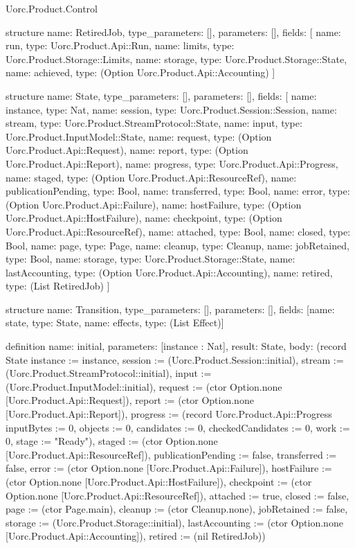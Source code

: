 \begin{lexlean}{Uorc.Product.Control}
\begin{semanticmodule}
structure{
  name: RetiredJob,
  type_parameters: [],
  parameters: [],
  fields: [
    {name: run, type: Uorc.Product.Api::Run},
    {name: limits, type: Uorc.Product.Storage::Limits},
    {name: storage, type: Uorc.Product.Storage::State},
    {name: achieved, type: (Option Uorc.Product.Api::Accounting)}
  ]
}

structure{
  name: State,
  type_parameters: [],
  parameters: [],
  fields: [
    {name: instance, type: Nat},
    {name: session, type: Uorc.Product.Session::Session},
    {name: stream, type: Uorc.Product.StreamProtocol::State},
    {name: input, type: Uorc.Product.InputModel::State},
    {name: request, type: (Option Uorc.Product.Api::Request)},
    {name: report, type: (Option Uorc.Product.Api::Report)},
    {name: progress, type: Uorc.Product.Api::Progress},
    {name: staged, type: (Option Uorc.Product.Api::ResourceRef)},
    {name: publicationPending, type: Bool},
    {name: transferred, type: Bool},
    {name: error, type: (Option Uorc.Product.Api::Failure)},
    {name: hostFailure, type: (Option Uorc.Product.Api::HostFailure)},
    {name: checkpoint, type: (Option Uorc.Product.Api::ResourceRef)},
    {name: attached, type: Bool},
    {name: closed, type: Bool},
    {name: page, type: Page},
    {name: cleanup, type: Cleanup},
    {name: jobRetained, type: Bool},
    {name: storage, type: Uorc.Product.Storage::State},
    {name: lastAccounting, type: (Option Uorc.Product.Api::Accounting)},
    {name: retired, type: (List RetiredJob)}
  ]
}

structure{
  name: Transition,
  type_parameters: [],
  parameters: [],
  fields: [{name: state, type: State}, {name: effects, type: (List Effect)}]
}

definition{
  name: initial,
  parameters: [instance : Nat],
  result: State,
  body: (record State {instance := instance, session := (Uorc.Product.Session::initial), stream := (Uorc.Product.StreamProtocol::initial), input := (Uorc.Product.InputModel::initial), request := (ctor Option.none [Uorc.Product.Api::Request]), report := (ctor Option.none [Uorc.Product.Api::Report]), progress := (record Uorc.Product.Api::Progress {inputBytes := 0, objects := 0, candidates := 0, checkedCandidates := 0, work := 0, stage := "Ready"}), staged := (ctor Option.none [Uorc.Product.Api::ResourceRef]), publicationPending := false, transferred := false, error := (ctor Option.none [Uorc.Product.Api::Failure]), hostFailure := (ctor Option.none [Uorc.Product.Api::HostFailure]), checkpoint := (ctor Option.none [Uorc.Product.Api::ResourceRef]), attached := true, closed := false, page := (ctor Page.main), cleanup := (ctor Cleanup.none), jobRetained := false, storage := (Uorc.Product.Storage::initial), lastAccounting := (ctor Option.none [Uorc.Product.Api::Accounting]), retired := (nil RetiredJob)})
}


\end{semanticmodule}
\end{lexlean}
